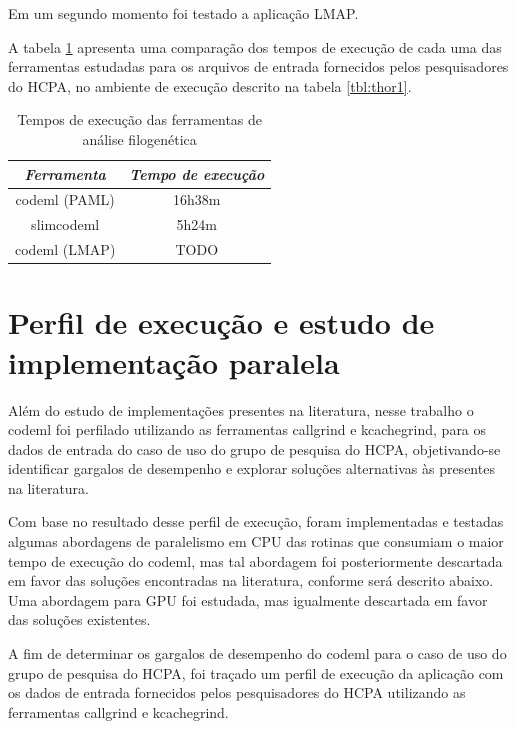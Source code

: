 \documentclass[cic,tc]{iiufrgs}
\begin{document}
Em um segundo momento foi testado a aplicação LMAP.\cite{maldonado2016lmap}

A tabela \ref{tbl:paml} apresenta uma comparação dos tempos de execução de cada
uma das ferramentas estudadas para os arquivos de entrada fornecidos pelos
pesquisadores do HCPA, no ambiente de execução descrito na tabela \ref{tbl:thor1}.

\begin{table}[h]
    \caption{Tempos de execução das ferramentas de análise filogenética}
    \centering
        \begin{tabular}{c|c}
          \hline
          \textit{Ferramenta}  &   \textit{Tempo de execução} \\
          \hline
          \hline
          codeml (PAML) & 16h38m \\
          slimcodeml & 5h24m \\
          codeml (LMAP) & TODO \\
          \hline
        \end{tabular}
    \label{tbl:paml}
\end{table}

\section{Perfil de execução e estudo de implementação paralela}
\label{subsec:codemlpar}

Além do estudo de implementações presentes na literatura, nesse trabalho o
codeml foi perfilado utilizando as ferramentas callgrind e
kcachegrind,\cite{weidendorfer2008sequential} para os dados de entrada do caso
de uso do grupo de pesquisa do HCPA, objetivando-se identificar gargalos de
desempenho e explorar soluções alternativas às presentes na literatura.

Com base no resultado desse perfil de execução, foram implementadas e testadas
algumas abordagens de paralelismo em CPU das rotinas que consumiam o maior
tempo de execução do codeml, mas tal abordagem foi posteriormente descartada em
favor das soluções encontradas na literatura, conforme será descrito abaixo.
Uma abordagem para GPU foi estudada, mas igualmente descartada em favor das
soluções existentes.

A fim de determinar os gargalos de desempenho do codeml para o caso de uso do
grupo de pesquisa do HCPA, foi traçado um perfil de execução da aplicação com
os dados de entrada fornecidos pelos pesquisadores do HCPA utilizando as
ferramentas callgrind e kcachegrind.\cite{weidendorfer2008sequential}
\end{document}
